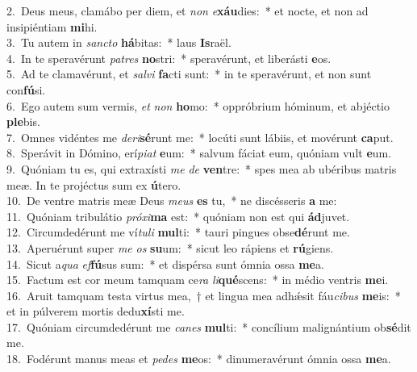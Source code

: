 {2.~}Deus meus, clamábo per diem, et \textit{non} \textit{e}\textbf{xáu}dies:~* et nocte, et non ad insipiéntiam \textbf{mi}hi.\\
{3.~}Tu autem in \textit{san}\textit{cto} \textbf{há}bitas:~* laus \textbf{Is}raël.\\
{4.~}In te speravérunt \textit{pa}\textit{tres} \textbf{no}stri:~* speravérunt, et liberásti \textbf{e}os.\\
{5.~}Ad te clamavérunt, et \textit{sal}\textit{vi} \textbf{fa}cti sunt:~* in te speravérunt, et non sunt con\textbf{fú}si.\\
{6.~}Ego autem sum vermis, \textit{et} \textit{non} \textbf{ho}mo:~* oppróbrium hóminum, et abjéctio \textbf{ple}bis.\\
{7.~}Omnes vidéntes me \textit{de}\textit{ri}\textbf{sé}runt me:~* locúti sunt lábiis, et movérunt \textbf{ca}put.\\
{8.~}Sperávit in Dómino, erí\textit{pi}\textit{at} \textbf{e}um:~* salvum fáciat eum, quóniam vult \textbf{e}um.\\
{9.~}Quóniam tu es, qui extraxísti \textit{me} \textit{de} \textbf{ven}tre:~* spes mea ab ubéribus matris meæ. In te projéctus sum ex \textbf{ú}tero.\\
{10.~}De ventre matris meæ Deus \textit{me}\textit{us} \textbf{es} tu,~* ne discésseris \textbf{a} me:\\
{11.~}Quóniam tribulátio \textit{pró}\textit{xi}\textbf{ma} est:~* quóniam non est qui \textbf{ád}juvet.\\
{12.~}Circumdedérunt me ví\textit{tu}\textit{li} \textbf{mul}ti:~* tauri pingues obse\textbf{dé}runt me.\\
{13.~}Aperuérunt super \textit{me} \textit{os} \textbf{su}um:~* sicut leo rápiens et \textbf{rú}giens.\\
{14.~}Sicut a\textit{qua} \textit{ef}\textbf{fú}sus sum:~* et dispérsa sunt ómnia ossa \textbf{me}a.\\
{15.~}Factum est cor meum tamquam ce\textit{ra} \textit{li}\textbf{qué}scens:~* in médio ventris \textbf{me}i.\\
{16.~}Aruit tamquam testa virtus mea,~† et lingua mea adhǽsit fáu\textit{ci}\textit{bus} \textbf{me}is:~* et in púlverem mortis dedu\textbf{xí}sti me.\\
{17.~}Quóniam circumdedérunt me \textit{ca}\textit{nes} \textbf{mul}ti:~* concílium malignántium ob\textbf{sé}dit me.\\
{18.~}Fodérunt manus meas et \textit{pe}\textit{des} \textbf{me}os:~* dinumeravérunt ómnia ossa \textbf{me}a.\\

